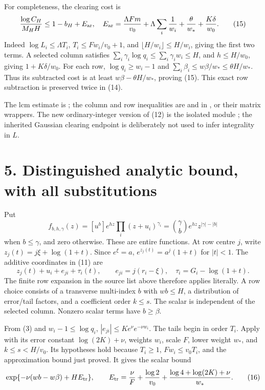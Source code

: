 \documentclass[11pt]{article}
\begin{document}
For completeness, the clearing cost is \[
\frac{\log C_H}{M_HH}\le1-b_H+E_{\rm ar},
\quad E_{\rm ar}=
\frac{\Lambda Fm}{v_0}+\Lambda\sum_i\frac1{w_i}
+\frac\theta{w_*}+\frac{K\delta}{w_0}.               \tag{15}
\] Indeed \(\log L_i\le\Lambda T_i\), \(T_i\le Fw_i/v_0+1\), and
\(\lfloor H/w_i\rfloor\le H/w_i\), giving the first two terms. A
selected column satisfies
\(\sum_i\gamma_i\log q_i\le\sum_i\gamma_iw_i\le H\), and \(h\le H/w_0\),
giving \(1+K\delta/w_0\). For each row, \(\log q_i\ge w_i-1\) and
\(\sum_i\beta_i\le w\beta/w_*\le\theta H/w_*\). Thus its subtracted cost
is at least \(w\beta-\theta H/w_*\), proving (15). This exact row
subtraction is preserved twice in (14).

The lcm estimate is ; the
column and row inequalities are  and
 in , or
their matrix wrappers. The new ordinary-integer version of (12) is the
isolated module ; the inherited
Gaussian clearing endpoint is deliberately not used to infer integrality
in \(L\).

\section{5. Distinguished analytic bound, with all
substitutions}\label{distinguished-analytic-bound-with-all-substitutions}

Put \[
f_{b,h,\gamma}(z)=[u^b]e^{hz}\prod_i(z+u_i)^{\gamma_i}
=\binom\gamma b e^{hz}z^{|\gamma|-|b|}
\] when \(b\le\gamma\), and zero otherwise. These are entire functions.
At row centre \(j\), write \(z_j(t)=j\xi+\log(1+t)\). Since
\(e^{\xi}=a\), \(e^{z_j(t)}=a^j(1+t)\) for \(|t|<1\). The additive
coordinates in (11) are \[
z_j(t)+u_i+e_{ji}+\tau_i(t),\qquad
e_{ji}=j(r_i-\xi),\quad \tau_i=G_i-\log(1+t).
\] The finite row expansion in the source list above therefore applies
literally. A row choice consists of a transverse multi-index \(b\) with
\(wb\le H\), a distribution of error/tail factors, and a coefficient
order \(k\le s\). The scalar is independent of the selected column.
Nonzero scalar terms have \(b\ge\beta\).

From (3) and \(w_i-1\le\log q_i\), \(|e_{ji}|\le Ke^\nu e^{-\nu w_i}\).
The tails begin in order \(T_i\). Apply
 with its error constant
\(\log(2K)+\nu\), weights \(w_i\), scale \(F\), lower weight \(w_*\),
and \(k\le s<H/v_0\). Its hypotheses hold because \(T_i\ge1\),
\(Fw_i\le v_0T_i\), and the approximation bound just proved. It gives
the scalar bound \[
\exp\{-\nu(wb-w\beta)+H E_{\rm tr}\},\qquad
E_{\rm tr}=\frac\nu F+\frac{\log2}{v_0}
+\frac{\log4+\log(2K)+\nu}{w_*}.                   \tag{16}
\]
\end{document}
